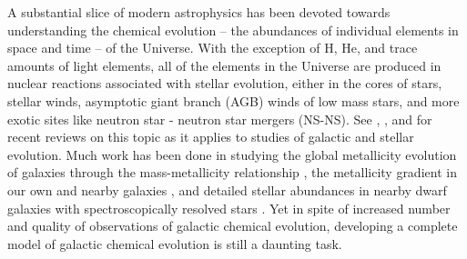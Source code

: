 A substantial slice of modern astrophysics has been devoted towards understanding the chemical evolution -- the abundances of individual elements in space and time -- of the Universe. With the exception of H, He, and trace amounts of light elements, all of the elements in the Universe are produced in nuclear reactions associated with stellar evolution, either in the cores of stars, stellar winds, asymptotic giant branch (AGB) winds of low mass stars, and more exotic sites like neutron star - neutron star mergers (NS-NS). See \cite{Nomoto2013}, \cite{Thielmann2017}, and \cite{Frebel2018} for recent reviews on this topic as it applies to studies of galactic and stellar evolution. Much work has been done in studying the global metallicity evolution of galaxies through the mass-metallicity relationship \citep[e.g.][]{Lequeux1979,Tremonti2004,Lee2006,Zahid2012,AndrewsMartini2013}, the metallicity gradient in our own and nearby galaxies \citep[e.g.][]{Searle1971,Shaver1983,Belfiore2017,SanchezMenguiano2017}, and detailed stellar abundances in nearby dwarf galaxies with spectroscopically resolved stars \citep[see the review in][]{Tolstoy2009}. Yet in spite of increased number and quality of observations of galactic chemical evolution, developing a complete model of galactic chemical evolution is still a daunting task.

